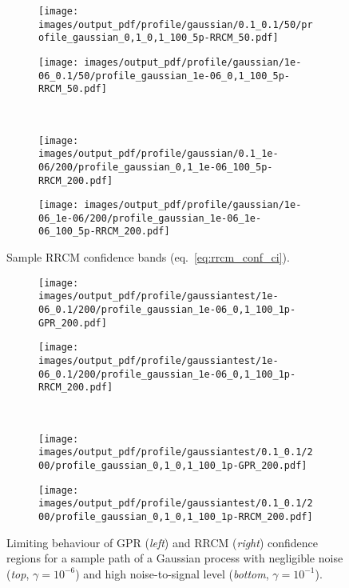 \documentclass[a4paper,14pt]{extarticle}
\begin{document}
\begin{figure}%
  \centering
  \begin{subfigure}[b]{0.5\linewidth}
    \texttt{[image: images/output\_pdf/profile/gaussian/0.1\_0.1/50/profile\_gaussian\_0,1\_0,1\_100\_5p-RRCM\_50.pdf]}
  \end{subfigure}%
  \begin{subfigure}[b]{0.5\linewidth}
    \texttt{[image: images/output\_pdf/profile/gaussian/1e-06\_0.1/50/profile\_gaussian\_1e-06\_0,1\_100\_5p-RRCM\_50.pdf]}
  \end{subfigure}\\
  \begin{subfigure}[b]{0.5\linewidth}
    \texttt{[image: images/output\_pdf/profile/gaussian/0.1\_1e-06/200/profile\_gaussian\_0,1\_1e-06\_100\_5p-RRCM\_200.pdf]}
  \end{subfigure}%
  \begin{subfigure}[b]{0.5\linewidth}
    \texttt{[image: images/output\_pdf/profile/gaussian/1e-06\_1e-06/200/profile\_gaussian\_1e-06\_1e-06\_100\_5p-RRCM\_200.pdf]}
  \end{subfigure}%
  \caption{Sample RRCM confidence bands (eq.~\ref{eq:rrcm_conf_ci}).}
  \label{fig:gauss_1d_prof_conf}
\end{figure}

\begin{figure}%
  \centering
  \begin{subfigure}[b]{0.5\linewidth}
    \texttt{[image: images/output\_pdf/profile/gaussiantest/1e-06\_0.1/200/profile\_gaussian\_1e-06\_0,1\_100\_1p-GPR\_200.pdf]}
  \end{subfigure}%
  \begin{subfigure}[b]{0.5\linewidth}
    \texttt{[image: images/output\_pdf/profile/gaussiantest/1e-06\_0.1/200/profile\_gaussian\_1e-06\_0,1\_100\_1p-RRCM\_200.pdf]}
  \end{subfigure}\\
  \begin{subfigure}[b]{0.5\linewidth}
    \texttt{[image: images/output\_pdf/profile/gaussiantest/0.1\_0.1/200/profile\_gaussian\_0,1\_0,1\_100\_1p-GPR\_200.pdf]}
  \end{subfigure}%
  \begin{subfigure}[b]{0.5\linewidth}
    \texttt{[image: images/output\_pdf/profile/gaussiantest/0.1\_0.1/200/profile\_gaussian\_0,1\_0,1\_100\_1p-RRCM\_200.pdf]}
  \end{subfigure}
  \caption{Limiting behaviour of GPR (\textit{left}) and RRCM (\textit{right})
  confidence regions for a sample path of a Gaussian process with negligible noise
  (\textit{top}, $\gamma=10^{-6}$) and high noise-to-signal level (\textit{bottom},
  $\gamma=10^{-1}$).}
  \label{fig:limit_1d_ci_size}
\end{figure}
\end{document}
